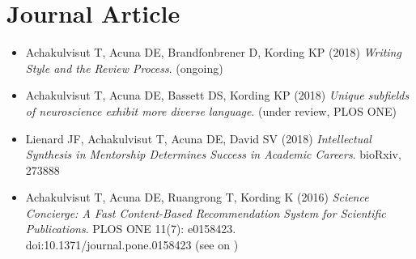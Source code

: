 \section{\sc Journal Article}

\begin{itemize}[leftmargin=0cm, label={}]

\item Achakulvisut T, Acuna DE, Brandfonbrener D, Kording KP (2018) {\em Writing Style and the Review Process}. (ongoing)

\item Achakulvisut T, Acuna DE, Bassett DS, Kording KP (2018) {\em Unique subfields of neuroscience exhibit more diverse language}. (under review, PLOS ONE)

\item Lienard JF, Achakulvisut T, Acuna DE, David SV (2018) {\em Intellectual Synthesis in Mentorship Determines Success in Academic Careers}. bioRxiv, 273888

\item Achakulvisut T, Acuna DE, Ruangrong T, Kording K (2016) {\em Science Concierge: A Fast Content-Based Recommendation System for Scientific Publications}. PLOS ONE 11(7): e0158423.\\ doi:10.1371/journal.pone.0158423
(see on \href{https://github.com/titipata/science_concierge}{\faGithubAlt})


\end{itemize}
